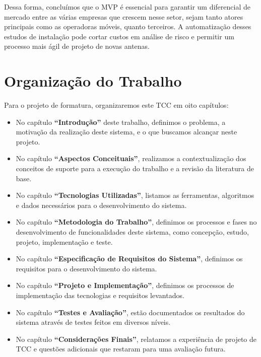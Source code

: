 \documentclass[]{politex}
\begin{document}
Dessa forma, concluímos que o MVP é essencial para garantir um diferencial de
mercado entre as várias empresas que crescem nesse setor, sejam tanto atores
principais como as operadoras móveis, quanto terceiros. A automatização desses estudos de instalação
pode cortar custos em análise de risco e permitir um processo mais ágil de projeto de novas
antenas.

\section{Organização do Trabalho}

Para o projeto de formatura, organizaremos este TCC em oito capítulos:

\begin{itemize}
\item No capítulo \textbf{``Introdução''} deste trabalho, definimos o problema, a motivação
da realização deste sistema, e o que buscamos alcançar neste projeto.

\item No capítulo \textbf{``Aspectos Conceituais''}, realizamos a
contextualização dos conceitos de suporte para a execução do trabalho e a
revisão da literatura de base.

\item No capítulo \textbf{``Tecnologias Utilizadas''}, listamos as ferramentas,
algoritmos e dados necessários para o desenvolvimento do sistema.

\item No capítulo \textbf{``Metodologia do Trabalho''}, definimos os processos e
fases no desenvolvimento de funcionalidades deste sistema, como concepção,
estudo, projeto, implementação e teste.

\item No capítulo \textbf{``Especificação de Requisitos do Sistema''}, definimos
os requisitos para o desenvolvimento do sistema.

\item No capítulo \textbf{``Projeto e Implementação''}, definimos os processos
de implementação das tecnologias e requisitos levantados.

\item No capítulo \textbf{``Testes e Avaliação''}, estão documentados os
resultados do sistema através de testes feitos em diversos níveis.

\item No capítulo \textbf{``Considerações Finais''}, relatamos a experiência de
projeto de TCC e questões adicionais que restaram para uma avaliação futura.

\end{itemize}
\end{document}
